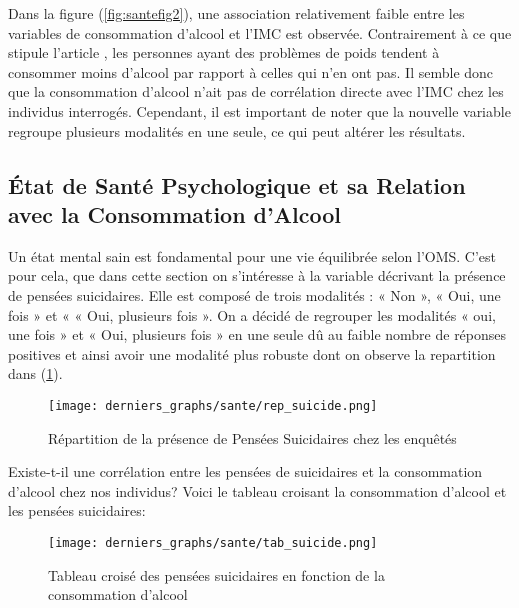 \documentclass{article}
\begin{document}
Dans la figure (\ref{fig:santefig2}), une association relativement faible entre les variables de consommation d'alcool et l'IMC est observée. Contrairement à ce que stipule l'article \cite{article7}, les personnes ayant des problèmes de poids tendent à consommer moins d'alcool par rapport à celles qui n'en ont pas. Il semble donc que la consommation d'alcool n'ait pas de corrélation directe avec l'IMC chez les individus interrogés. Cependant, il est important de noter que la nouvelle variable regroupe plusieurs modalités en une seule, ce qui peut altérer les résultats. 


\subsection{État de Santé Psychologique et sa Relation avec la Consommation d'Alcool}
Un état mental sain est fondamental pour une vie équilibrée selon l'OMS. C'est pour cela, que dans cette section on s'intéresse à la variable décrivant la présence de pensées suicidaires. Elle est composé de trois modalités :  « Non »,  « Oui, une fois » et  «  « Oui, plusieurs fois ». On a décidé de regrouper les modalités  « oui, une fois » et « Oui, plusieurs fois » en une seule dû au faible nombre de réponses positives et ainsi avoir une modalité plus robuste dont on observe la repartition dans (\ref{fig:penssuicide12}).

\begin{figure}[H]
\centering
 
    \texttt{[image: derniers\_graphs/sante/rep\_suicide.png]}
 
  \caption{Répartition de la présence de Pensées Suicidaires chez les enquêtés}
  \label{fig:penssuicide12}
    
\end{figure}

Existe-t-il une corrélation entre les pensées de suicidaires et la consommation d'alcool chez nos individus? 
Voici le tableau croisant la consommation d'alcool et les pensées suicidaires:

\begin{figure}[H]
\centering
\texttt{[image: derniers\_graphs/sante/tab\_suicide.png]}
  \caption{ Tableau croisé des pensées suicidaires en fonction de la consommation d'alcool}
  \label{fig:sante3}
\end{figure}
\end{document}

